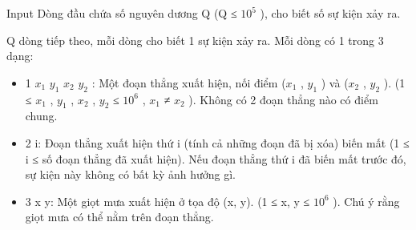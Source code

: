 Input
Dòng đầu chứa số nguyên dương Q (Q ≤ $10^{5}$ ), cho biết số sự kiện xảy ra.

Q dòng tiếp theo, mỗi dòng cho biết 1 sự kiện xảy ra. Mỗi dòng có 1 trong 3 dạng:
\begin{itemize}
	\item 1 $x_{1}$ $y_{1}$ $x_{2}$ $y_{2}$ : Một đoạn thẳng xuất hiện, nối điểm ($x_{1}$ , $y_{1}$ ) và ($x_{2}$ , $y_{2}$ ). (1 ≤ $x_{1}$ , $y_{1}$ , $x_{2}$ , $y_{2}$ ≤ $10^{6}$ , $x_{1}$ ≠ $x_{2}$ ). Không có 2 đoạn thẳng nào có điểm chung.
	\item 2 i: Đoạn thẳng xuất hiện thứ i (tính cả những đoạn đã bị xóa) biến mất (1 ≤ i ≤ số đoạn thẳng đã xuất hiện). Nếu đoạn thẳng thứ i đã biến mất trước đó, sự kiện này không có bất kỳ ảnh hưởng gì.
	\item 3 x y: Một giọt mưa xuất hiện ở tọa độ (x, y). (1 ≤ x, y ≤ $10^{6}$ ). Chú ý rằng giọt mưa có thể nằm trên đoạn thẳng.
\end{itemize}